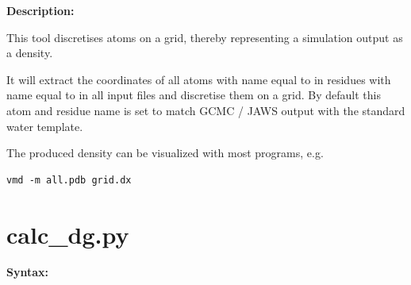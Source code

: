 \documentclass[letterpaper,10pt,english]{manual}
\begin{document}
\textbf{Description:}

This tool discretises atoms on a grid, thereby representing a simulation output as a density.

It will extract the coordinates of all atoms with name equal to  in residues with name equal to  in all input files and discretise them on a grid. By default this atom and residue name is set to match GCMC / JAWS output with the standard water template.

The produced density can be visualized with most programs, e.g.

\begin{Verbatim}[commandchars=@\[\]]
vmd -m all.pdb grid.dx
\end{Verbatim}


\section{calc\_dg.py}

\textbf{Syntax:}
\end{document}
